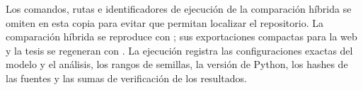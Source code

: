 \ifdefined\blindreviewmode
Los comandos, rutas e identificadores de ejecución de la comparación híbrida se omiten en esta copia para evitar que permitan localizar el repositorio.
\else
La comparación híbrida se reproduce con ; sus exportaciones compactas para la web y la tesis se regeneran con . La ejecución \code{\HybridRunID} registra las configuraciones exactas del modelo y el análisis, los rangos de semillas, la versión de Python, los hashes de las fuentes y las sumas de verificación de los resultados.
\fi
